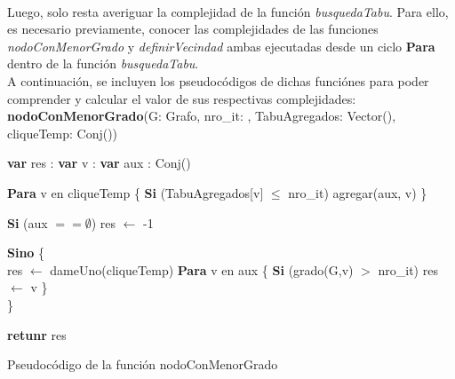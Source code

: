 \paragraph{}
Luego, solo resta averiguar la complejidad de la función \textit{busquedaTabu}. Para ello, es necesario previamente, conocer las complejidades de las funciones \textit{nodoConMenorGrado} y \textit{definirVecindad} ambas ejecutadas desde un ciclo \textbf{Para} dentro de la función \textit{busquedaTabu}.\\
A continuación, se incluyen los pseudocódigos de dichas funciónes para poder comprender y calcular el valor de sus respectivas complejidades: \\

\footnotesize 
\textbf{nodoConMenorGrado}(G: Grafo, nro\_it: \entero, TabuAgregados: Vector(\entero), cliqueTemp: Conj(\entero)) \\
\begin{algorithm}[H]
\linesnumbered
\incmargin{3em}

	\BlankLine
	\textbf{var} res : \entero											{}
	\textbf{var} v : \entero												{}
	\textbf{var} aux : Conj(\entero)										

	\BlankLine \BlankLine
	\textbf{Para} v en cliqueTemp \{		 								
	\tab \textbf{Si} (TabuAgregados[v] $\leq$ nro\_it)	 				
	\tab \tab agregar(aux, v)												
	\}
	
	\BlankLine \BlankLine
	\textbf{Si} (aux $== \emptyset$) 									
	\tab res $\leftarrow$ -1												

	\BlankLine \BlankLine
	\textbf{Sino}  \{ \\		 							
	\tab res $\leftarrow$ dameUno(cliqueTemp)							
	\tab \textbf{Para} v en aux \{										
	\tab \tab \textbf{Si} (grado(G,v) $>$ nro\_it)	 					
	\tab \tab \tab res $\leftarrow$ v									
	\tab \} \\
	\}
	
	\BlankLine \BlankLine
	\textbf{retunr} res													
\caption{Pseudocódigo de la función nodoConMenorGrado} 
\end{algorithm}
\normalsize

